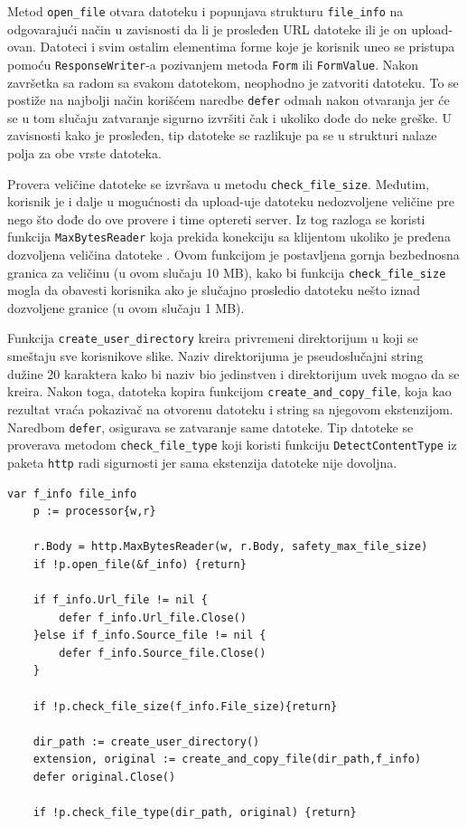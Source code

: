 \documentclass[12pt,oneside]{memoir}
\begin{document}
Metod \texttt{open\_file} otvara datoteku i popunjava strukturu \texttt{file\_info} na odgovarajući način u zavisnosti da li je prosleđen URL datoteke ili je on upload-ovan. Datoteci i svim ostalim elementima forme koje je korisnik uneo se pristupa pomoću \texttt{ResponseWriter}-a pozivanjem metoda \texttt{Form} ili \texttt{FormValue}. Nakon završetka sa radom sa svakom datotekom, neophodno je zatvoriti datoteku. To se postiže na najbolji način korišćem naredbe \texttt{defer} odmah nakon otvaranja jer će se u tom slučaju zatvaranje sigurno izvršiti čak i ukoliko dođe do neke greške. U zavisnosti kako je prosleđen, tip datoteke se razlikuje pa se u strukturi nalaze polja za obe vrste datoteka. 

Provera veličine datoteke se izvršava u metodu \texttt{check\_file\_size}. Međutim, korisnik je i dalje u mogućnosti da upload-uje datoteku nedozvoljene veličine pre nego što dođe do ove provere i time optereti server. Iz tog razloga se koristi funkcija \texttt{MaxBytesReader} koja prekida konekciju sa klijentom ukoliko je pređena dozvoljena veličina datoteke \cite{http}. Ovom funkcijom je postavljena gornja bezbednosna granica za veličinu (u ovom slučaju 10 MB), kako bi funkcija \texttt{check\_file\_size} mogla da obavesti korisnika ako je slučajno prosledio datoteku nešto iznad dozvoljene granice (u ovom slučaju 1 MB). 

Funkcija \texttt{create\_user\_directory} kreira privremeni direktorijum u koji se smeštaju sve korisnikove slike. Naziv direktorijuma je pseudoslučajni string dužine 20 karaktera kako bi naziv bio jedinstven i direktorijum uvek mogao da se kreira. Nakon toga, datoteka kopira funkcijom \texttt{create\_and\_copy\_file}, koja kao rezultat vraća pokazivač na otvorenu datoteku i string sa njegovom ekstenzijom. Naredbom \texttt{defer}, osigurava se zatvaranje same datoteke. Tip datoteke se proverava metodom  \texttt{check\_file\_type} koji koristi funkciju \texttt{DetectContentType} iz paketa \texttt{http} radi sigurnosti jer sama ekstenzija datoteke nije dovoljna.

\begin{center}
\begin{lstlisting}[caption=Otvaranje i provera datoteke u funkciji ImageHandler,label={lst:open},  backgroundcolor=\color{background}]
	var f_info file_info
	p := processor{w,r}

	r.Body = http.MaxBytesReader(w, r.Body, safety_max_file_size)
	if !p.open_file(&f_info) {return}

	if f_info.Url_file != nil {
		defer f_info.Url_file.Close()
	}else if f_info.Source_file != nil {
		defer f_info.Source_file.Close()
	}

	if !p.check_file_size(f_info.File_size){return}

	dir_path := create_user_directory()
	extension, original := create_and_copy_file(dir_path,f_info)
	defer original.Close()

	if !p.check_file_type(dir_path, original) {return}
\end{lstlisting}
\end{center}
 
\end{document}
